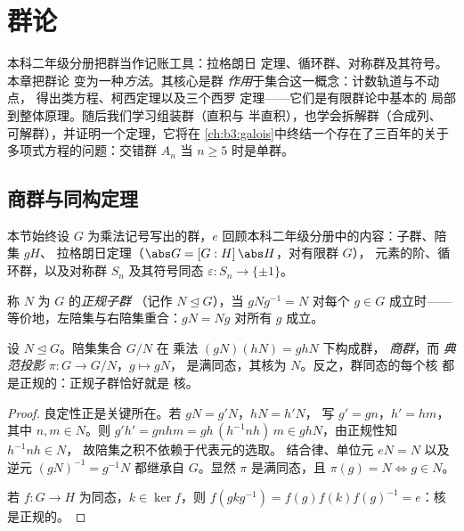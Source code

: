 \chapter{群论}\label{ch:b3:groups}

本科二年级分册把群当作记账工具：拉格朗日
定理、循环群、对称群及其符号。本章把群论
变为一种\emph{方法}。其核心是群
\emph{作用}于集合这一概念：计数轨道与不动点，
得出类方程、柯西定理以及三个西罗
定理——它们是有限群论中基本的
局部到整体原理。随后我们学习组装群（直积与
半直积），也学会拆解群（合成列、
可解群），并证明一个定理，它将在
\cref{ch:b3:galois}中终结一个存在了三百年的关于
多项式方程的问题：交错群 $A_n$ 当 $n
\geq 5$ 时是单群。

\section{商群与同构定理}

本节始终设 $G$ 为乘法记号写出的群，$e$
回顾本科二年级分册中的内容：子群、陪集 $gH$、
拉格朗日定理（$\abs G = [G:H]\,\abs H$，对有限群 $G$），
元素的阶、循环群，以及对称群 $S_n$
及其符号同态 $\varepsilon \colon S_n \to \{\pm1\}$。

\begin{definition}\label{def:b3:groups:normal}
称 $N$ 为 $G$ 的\emph{正规子群}
（记作 $N \trianglelefteq G$），当 $gNg^{-1} = N$ 对每个 $g
\in G$ 成立时——等价地，左陪集与右陪集重合：$gN =
Ng$ 对所有 $g$ 成立。
\end{definition}

\begin{theorem}[商群]\label{thm:b3:groups:quotient}
设 $N \trianglelefteq G$。陪集集合 $G/N$ 在
乘法 $(gN)(hN) = ghN$ 下构成群，
\emph{商群}，而
\emph{典范投影} $\pi \colon G \to G/N$，$g \mapsto gN$，
是满同态，其核为 $N$。反之，群同态的每个核
都是正规的：正规子群恰好就是
核。
\end{theorem}

\begin{proof}
良定性正是关键所在。若 $gN = g'N$，$hN = h'N$，
写 $g' = gn$，$h' = hm$，其中 $n, m \in N$。则 $g'h' = gnhm =
gh\,(h^{-1}nh)\,m \in ghN$，由正规性知 $h^{-1}nh \in N$，
故陪集之积不依赖于代表元的选取。
结合律、单位元 $eN = N$ 以及逆元 $(gN)^{-1} = g^{-1}N$
都继承自 $G$。显然 $\pi$ 是满同态，且
$\pi(g) = N \iff g \in N$。

若 $f \colon G \to H$ 为同态，$k \in \ker f$，则
$f(gkg^{-1}) = f(g)f(k)f(g)^{-1} = e$：核是正规的。
\end{proof}

